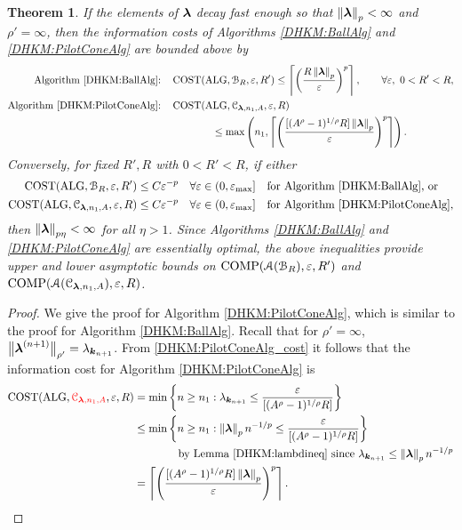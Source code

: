 \documentclass[USenglish]{article}
\theoremstyle{dgthm}
\newtheorem{theorem}{Theorem}
\theoremstyle{dgthm}
\theoremstyle{dgthm}
\theoremstyle{dgthm}
\theoremstyle{dgdef}
\theoremstyle{definition}
\DeclareMathOperator{\ALG}{ALG}
\DeclareMathOperator{\COST}{COST}
\DeclareMathOperator{\COMP}{COMP}
\newcommand{\norm}[2][{}]{\ensuremath{\left \lVert #2 \right \rVert}_{#1}}
\newcommand{\bignorm}[2][{}]{\ensuremath{\bigl \lVert #2 \bigr \rVert}_{#1}}
\newcommand{\DHKMchange}[1]{{\color{red}{#1}}}
\begin{document}
{\begin{theorem} \label{DHKM:thm:costbdspilot}
If the elements of ${\boldsymbol{\lambda}}$ decay fast enough so that $\norm[p]{\bslambda} < \infty$ and $\rho'=\infty$, then the information costs of Algorithms \ref{DHKM:BallAlg} and \ref{DHKM:PilotConeAlg} are bounded above by
\begin{align*}
    \text{Algorithm \ref{DHKM:BallAlg}:} \quad& \COST(\ALG,\calB_R,\varepsilon, R') 
    \le \left \lceil  \left(\frac{R \norm[p]{\bslambda}}{\varepsilon}\right)^p     \right \rceil, \qquad \forall \varepsilon, \ 0 < R' < R, \\
    \text{Algorithm \ref{DHKM:PilotConeAlg}:} \quad& \COST(\ALG,\calC_{\bslambda,n_1,A},\varepsilon, R) 
    \\ & \qquad \qquad \le \max \left( n_1, 
    \left \lceil  \left(\frac{[(A^\rho -1)^{1/\rho}R] \norm[p]{\bslambda}}{\varepsilon}\right)^p \right \rceil \right).
    \end{align*}
Conversely, for fixed $R', R$ with $0 < R' < R$, if either
\begin{align*}
    \COST(\ALG,\calB_R,\varepsilon, R') 
    \le C \varepsilon^{-p} & \quad \forall \varepsilon \in (0,\varepsilon_{\max}] \quad  \text{for Algorithm \ref{DHKM:BallAlg}, or }  \\
     \COST(\ALG,\calC_{\bslambda,n_1,A},\varepsilon, R) 
    \le C \varepsilon^{-p} & \quad \forall \varepsilon \in (0,\varepsilon_{\max}] \quad \text{for Algorithm \ref{DHKM:PilotConeAlg}},
    \end{align*}
then $\norm[p\eta]{\bslambda} < \infty$ for all $\eta > 1$.  Since Algorithms \ref{DHKM:BallAlg} and \ref{DHKM:PilotConeAlg} are essentially optimal, the above inequalities provide upper and lower asymptotic bounds on  $\COMP(\calA(\calB_R),\varepsilon,R')$ and $\COMP(\calA(\calC_{\bslambda,n_1,A}),\varepsilon,R)$.
\end{theorem}
\begin{proof}
We give the proof for Algorithm \ref{DHKM:PilotConeAlg}, which is similar to the proof for Algorithm \ref{DHKM:BallAlg}.  Recall that for $\rho'=\infty$, $\bignorm[\rho']{\bslambda^{(n+1)}} = \lambda_{\bsk_{n+1}}$. From \eqref{DHKM:PilotConeAlg_cost} it follows that the information cost for  Algorithm \ref{DHKM:PilotConeAlg} is
\begin{align*} 
    \COST(\ALG,\DHKMchange{\calC_{\boldsymbol{\lambda},n_1,A}},\varepsilon,R)
    & = \min \left \{n \ge n_1 : \lambda_{\bsk_{n+1}}
    \le \frac{\varepsilon}{[(A^\rho -1)^{1/\rho}R]} \right \} \\
  & \le  \min \left \{n \ge n_1 : \norm[p]{\bslambda}n^{-1/p}
    \le \frac{\varepsilon}{[(A^\rho -1)^{1/\rho}R]} \right \} \\
    & \qquad \qquad \text{by Lemma \ref{DHKM:lambdineq} since } \lambda_{\bsk_{n+1}} \le \norm[p]{\bslambda}n^{-1/p}\\
  & = \left \lceil  \left(\frac{[(A^\rho -1)^{1/\rho}R] \norm[p]{\bslambda}}{\varepsilon}\right)^p \right \rceil.
\end{align*}


\end{proof}}
\end{document}
